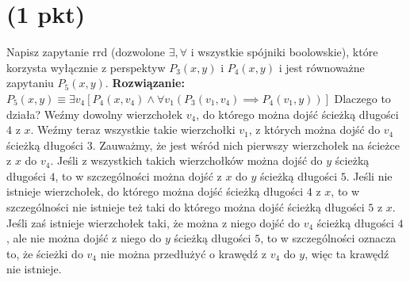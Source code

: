 \documentclass{article}
\begin{document}
\section{(1 pkt)}
Napisz zapytanie rrd (dozwolone $\exists, \forall$ i wszystkie spójniki boolowskie), które korzysta wyłącznie z perspektyw $P_3(x, y)$ i $P_4(x, y)$ i jest równoważne zapytaniu $P_5(x, y)$.
\newline \textbf{Rozwiązanie:}
$P_5(x,y) \equiv 
\exists v_4 [P_4(x, v_4) \wedge \forall v_1 (P_3(v_1, v_4) \implies P_4(v_1, y))]
$
\newline Dlaczego to działa?
Weźmy dowolny wierzchołek $v_4$, do którego można dojść ścieżką długości $4$ z $x$. Weźmy teraz wszystkie takie wierzchołki $v_1$, z których można dojść do $v_4$ ścieżką długości $3$. Zauważmy, że jest wśród nich pierwszy wierzchołek na ścieżce z $x$ do $v_4$. Jeśli z wszystkich takich wierzchołków można dojść do $y$ ścieżką długości $4$, to w szczególności można dojść z $x$ do $y$ ścieżką długości $5$.
\newline \newline
Jeśli nie istnieje wierzchołek, do którego można dojść ścieżką długości $4$ z $x$, to w szczególności nie istnieje też taki do którego można dojść ścieżką długości $5$ z $x$.
\newline
Jeśli zaś istnieje wierzchołek taki, że można z niego dojść do $v_4$ ścieżką długości $4$, ale nie można dojść z niego do $y$ ścieżką długości $5$, to w szczególności oznacza to, że ścieżki do $v_4$ nie można przedłużyć o krawędź z $v_4$ do $y$, więc ta krawędź nie istnieje.
\end{document}
